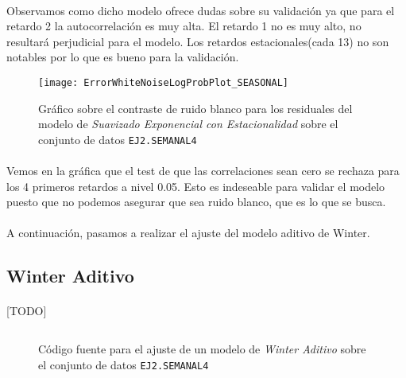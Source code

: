 \documentclass[a4paper, spanish]{article}
\begin{document}
      \paragraph{}
      Observamos como dicho modelo ofrece dudas sobre su validación ya que para el retardo 2 la autocorrelación es muy alta. El retardo 1 no es muy alto, no resultará perjudicial para el modelo. Los retardos estacionales(cada 13) no son notables por lo que es bueno para la validación.

      \begin{figure}[htb!]
        \centering
        \texttt{[image: ErrorWhiteNoiseLogProbPlot\_SEASONAL]}
        \caption{Gráfico sobre el contraste de ruido blanco para los residuales del modelo de \emph{Suavizado Exponencial con Estacionalidad} sobre el conjunto de datos \texttt{EJ2.SEMANAL4}}
        \label{img:b_seasonal_test_white_noise}
      \end{figure}

      \paragraph{}
      Vemos en la gráfica que el test de que las correlaciones sean cero se rechaza para los 4 primeros retardos a nivel 0.05. Esto es indeseable para validar el modelo puesto que no podemos asegurar que sea ruido blanco, que es lo que se busca.

      \paragraph{}
      A continuación, pasamos a realizar el ajuste del modelo aditivo de Winter.

    \subsection{Winter Aditivo}

      \paragraph{}
      [TODO]

      \begin{figure}[htb!]
        \centering
        \inputminted{SAS}{./res/code/b-01-esm-winteradd.sas}
        \caption{Código fuente para el ajuste de un modelo de \emph{Winter Aditivo} sobre el conjunto de datos \texttt{EJ2.SEMANAL4}}
        \label{code:b_winter_additive_esm}
      \end{figure}
\end{document}
